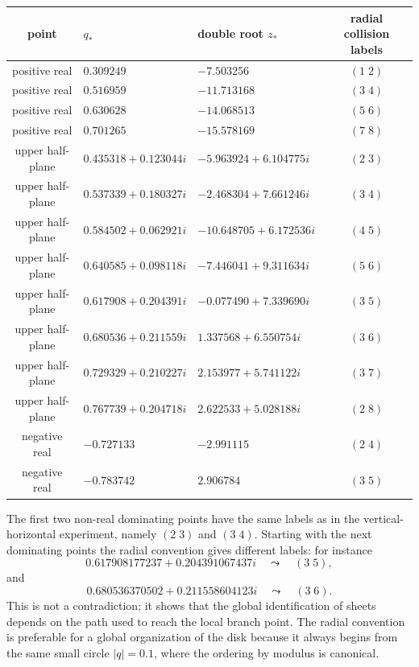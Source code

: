 \documentclass[11pt,a4paper,reqno]{amsart}
\theoremstyle{remark}
\begin{document}
\begin{center}
\footnotesize
\begin{tabular}{@{}c l l c@{}}
\toprule
point & \(q_*\) & double root \(z_*\) & radial collision labels\\
\midrule
positive real & $0.309249$ & $-7.503256$ & $(1\;2)$\\
positive real & $0.516959$ & $-11.713168$ & $(3\;4)$\\
positive real & $0.630628$ & $-14.068513$ & $(5\;6)$\\
positive real & $0.701265$ & $-15.578169$ & $(7\;8)$\\
\midrule
upper half-plane & $0.435318+0.123044i$ & $-5.963924+6.104775i$ & $(2\;3)$\\
upper half-plane & $0.537339+0.180327i$ & $-2.468304+7.661246i$ & $(3\;4)$\\
upper half-plane & $0.584502+0.062921i$ & $-10.648705+6.172536i$ & $(4\;5)$\\
upper half-plane & $0.640585+0.098118i$ & $-7.446041+9.311634i$ & $(5\;6)$\\
upper half-plane & $0.617908+0.204391i$ & $-0.077490+7.339690i$ & $(3\;5)$\\
upper half-plane & $0.680536+0.211559i$ & $1.337568+6.550754i$ & $(3\;6)$\\
upper half-plane & $0.729329+0.210227i$ & $2.153977+5.741122i$ & $(3\;7)$\\
upper half-plane & $0.767739+0.204718i$ & $2.622533+5.028188i$ & $(2\;8)$\\
\midrule
negative real & $-0.727133$ & $-2.991115$ & $(2\;4)$\\
negative real & $-0.783742$ & $ 2.906784$ & $(3\;5)$\\
\bottomrule
\end{tabular}
\end{center}

The first two non-real dominating points have the same labels as in the vertical-horizontal experiment, namely \((2\;3)\) and \((3\;4)\).  Starting with the next dominating points the radial convention gives different labels: for instance
\[
        0.617908177237+0.204391067437i
        \quad\leadsto\quad (3\;5),
\]
and
\[
        0.680536370502+0.211558604123i
        \quad\leadsto\quad (3\;6).
\]
This is not a contradiction; it shows that the global identification of sheets depends on the path used to reach the local branch point.  The radial convention is preferable for a global organization of the disk because it always begins from the same small circle \(|q|=0.1\), where the ordering by modulus is canonical.
\end{document}
